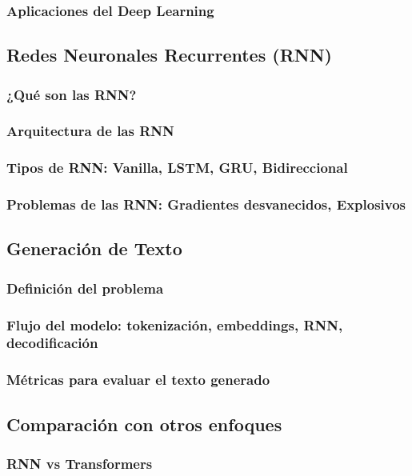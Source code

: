 \documentclass{article}
\begin{document}
\subsubsection{Aplicaciones del Deep Learning}

\subsection{Redes Neuronales Recurrentes (RNN)}
\subsubsection{¿Qué son las RNN?}
\subsubsection{Arquitectura de las RNN}
\subsubsection{Tipos de RNN: Vanilla, LSTM, GRU, Bidireccional}
\subsubsection{Problemas de las RNN: Gradientes desvanecidos, Explosivos}

\subsection{Generación de Texto}
\subsubsection{Definición del problema}
\subsubsection{Flujo del modelo: tokenización, embeddings, RNN, decodificación}
\subsubsection{Métricas para evaluar el texto generado}

\subsection{Comparación con otros enfoques}
\subsubsection{RNN vs Transformers}
\end{document}
